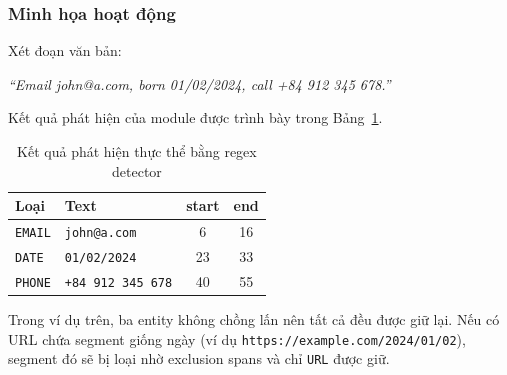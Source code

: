 \subsubsection{Minh họa hoạt động}

Xét đoạn văn bản:

\begin{center}
    \textit{``Email john@a.com, born 01/02/2024, call +84 912 345 678.''}
\end{center}

Kết quả phát hiện của module được trình bày trong Bảng~\ref{tab:regex_example}.

\begin{table}[H]
    \centering
    \caption{Kết quả phát hiện thực thể bằng regex detector}
    \label{tab:regex_example}
    \renewcommand{\arraystretch}{1.3}
    \begin{tabular}{l l c c}
        \toprule
        \textbf{Loại}    & \textbf{Text}               & \textbf{start} & \textbf{end} \\
        \midrule
        \texttt{EMAIL}   & \texttt{john@a.com}         & 6              & 16           \\
        \texttt{DATE}    & \texttt{01/02/2024}         & 23             & 33           \\
        \texttt{PHONE}   & \texttt{+84 912 345 678}    & 40             & 55           \\
        \bottomrule
    \end{tabular}
\end{table}

Trong ví dụ trên, ba entity không chồng lấn nên tất cả đều được giữ lại. Nếu
có URL chứa segment giống ngày (ví dụ
\texttt{https://example.com/2024/01/02}), segment đó sẽ bị loại nhờ exclusion
spans và chỉ \texttt{URL} được giữ.